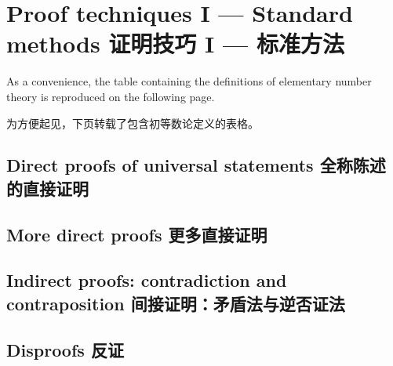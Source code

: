 \chapter[Proof techniques I]{Proof techniques I --- Standard methods 证明技巧 I --- 标准方法}

As a convenience, the table containing the definitions of elementary number theory is reproduced on the following page.

为方便起见，下页转载了包含初等数论定义的表格。


\clearpage 

\section{Direct proofs of universal statements 全称陈述的直接证明}









\newpage
\section{More direct proofs 更多直接证明}





\newpage

\section[Contradiction and contraposition]{Indirect proofs: contradiction and contraposition 间接证明：矛盾法与逆否证法}




\newpage

\section{Disproofs 反证}





